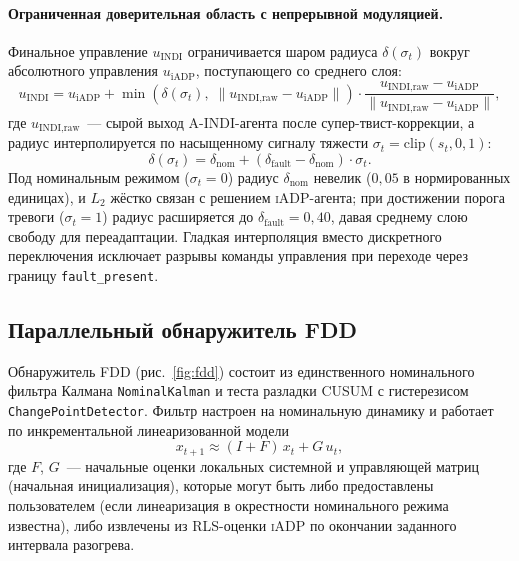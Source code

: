 \documentclass[a4paper,14pt]{extarticle}
\newcommand{\IADP}{\textsc{iADP}}
\newcommand{\AINDI}{\textsc{A-INDI}}
\newcommand{\FDD}{\textsc{FDD}}
\newcommand{\CUSUM}{\textsc{CUSUM}}
\newcommand{\RLS}{\textsc{RLS}}
\begin{document}
\paragraph{Ограниченная доверительная область с непрерывной модуляцией.} Финальное управление $u_{\text{INDI}}$ ограничивается шаром радиуса $\delta(\sigma_t)$ вокруг абсолютного управления $u_{\text{iADP}}$, поступающего со среднего слоя:
\begin{equation}
u_{\text{INDI}} = u_{\text{iADP}} + \min\!\left(\delta(\sigma_t),\; \|u_{\text{INDI,raw}} - u_{\text{iADP}}\|\right) \cdot \frac{u_{\text{INDI,raw}} - u_{\text{iADP}}}{\|u_{\text{INDI,raw}} - u_{\text{iADP}}\|},
\label{eq:trust-region}
\end{equation}
где $u_{\text{INDI,raw}}$~--- сырой выход \AINDI{}-агента после супер-твист-коррекции, а радиус интерполируется по насыщенному сигналу тяжести $\sigma_t=\mathrm{clip}(s_t,0,1)$:
\begin{equation}
\delta(\sigma_t) = \delta_{\text{nom}} + (\delta_{\text{fault}} - \delta_{\text{nom}}) \cdot \sigma_t.
\label{eq:trust-radius}
\end{equation}
Под номинальным режимом ($\sigma_t=0$) радиус $\delta_{\text{nom}}$ невелик ($0{,}05$ в нормированных единицах), и $L_2$ жёстко связан с решением \IADP{}-агента; при достижении порога тревоги ($\sigma_t=1$) радиус расширяется до $\delta_{\text{fault}}=0{,}40$, давая среднему слою свободу для переадаптации. Гладкая интерполяция вместо дискретного переключения исключает разрывы команды управления при переходе через границу \texttt{fault\_present}.

\subsection{Параллельный обнаружитель FDD}

Обнаружитель \FDD{} (рис.~\ref{fig:fdd}) состоит из единственного номинального фильтра Калмана \texttt{NominalKalman} и теста разладки \CUSUM{} с гистерезисом \texttt{ChangePointDetector}. Фильтр настроен на номинальную динамику и работает по инкрементальной линеаризованной модели
\begin{equation}
x_{t+1} \approx (I + F)\,x_t + G\,u_t,
\label{eq:kalman-model}
\end{equation}
где $F$, $G$~--- начальные оценки локальных системной и управляющей матриц (начальная инициализация), которые могут быть либо предоставлены пользователем (если линеаризация в окрестности номинального режима известна), либо извлечены из \RLS{}-оценки \IADP{} по окончании заданного интервала разогрева.
\end{document}
